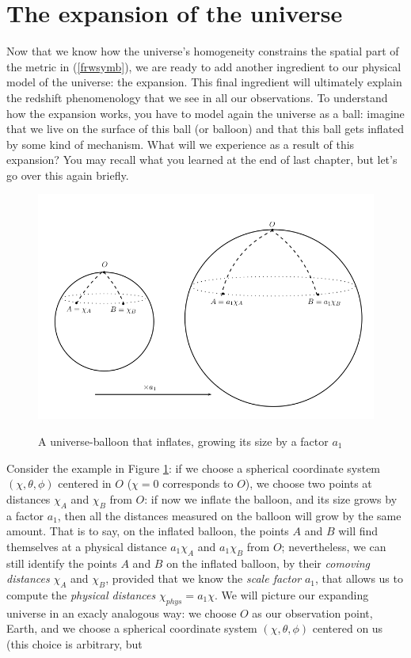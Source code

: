 \section{The expansion of the universe}
Now that we know how the universe's homogeneity constrains the spatial part of the metric in (\ref{frwsymb}), we are ready to add another ingredient to our physical model of the universe: the expansion. This final ingredient will ultimately explain the redshift phenomenology that we see in all our observations. To understand how the expansion works, you have to model again the universe as a ball: imagine that we live on the surface of this ball (or balloon) and that this ball gets inflated by some kind of mechanism. What will we experience as a result of this expansion? You may recall what you learned at the end of last chapter, but let's go over this again briefly. 
\begin{figure}
\begin{center}
\includegraphics[scale=0.8]{Draw/expansion.png}
\label{}
\end{center}
\caption{A universe-balloon that inflates, growing its size by a factor $a_1$}
\label{expansion}
\end{figure}
Consider the example in Figure \ref{expansion}: if we choose a spherical coordinate system $(\chi,\theta,\phi)$ centered in $O$ ($\chi=0$ corresponds to $O$), we choose two points at distances $\chi_A$ and $\chi_B$ from $O$: if now we inflate the balloon, and its size grows by a factor $a_1$, then all the distances measured on the balloon will grow by the same amount. That is to say, on the inflated balloon, the points $A$ and $B$ will find themselves at a physical distance $a_1\chi_A$ and $a_1\chi_B$ from $O$; nevertheless, we can still identify the points $A$ and $B$ on the inflated balloon, by their \textit{comoving distances} $\chi_A$ and $\chi_B$, provided that we know the \textit{scale factor} $a_1$, that allows us to compute the \textit{physical distances} $\chi_{phys}=a_1\chi$. We will picture our expanding universe in an exacly analogous way: we choose $O$ as our observation point, Earth, and we choose a spherical coordinate system $(\chi,\theta,\phi)$ centered on us (this choice is arbitrary, but 
